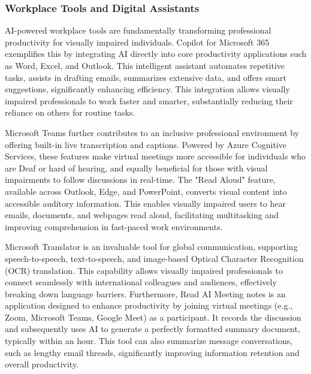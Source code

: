 \subsubsection{Workplace Tools and Digital Assistants}

AI-powered workplace tools are fundamentally transforming professional productivity for visually impaired individuals. Copilot for Microsoft 365 exemplifies this by integrating AI directly into core productivity applications such as Word, Excel, and Outlook. This intelligent assistant automates repetitive tasks, assists in drafting emails, summarizes extensive data, and offers smart suggestions, significantly enhancing efficiency. This integration allows visually impaired professionals to work faster and smarter, substantially reducing their reliance on others for routine tasks. \cite{lexgillette2024}

Microsoft Teams further contributes to an inclusive professional environment by offering built-in live transcription and captions. Powered by Azure Cognitive Services, these features make virtual meetings more accessible for individuals who are Deaf or hard of hearing, and equally beneficial for those with visual impairments to follow discussions in real-time. \cite{lexgillette2024} The "Read Aloud" feature, available across Outlook, Edge, and PowerPoint, converts visual content into accessible auditory information. This enables visually impaired users to hear emails, documents, and webpages read aloud, facilitating multitasking and improving comprehension in fast-paced work environments. \cite{lexgillette2024}

Microsoft Translator is an invaluable tool for global communication, supporting speech-to-speech, text-to-speech, and image-based Optical Character Recognition (OCR) translation. This capability allows visually impaired professionals to connect seamlessly with international colleagues and audiences, effectively breaking down language barriers. \cite{lexgillette2024} Furthermore, Read AI Meeting notes is an application designed to enhance productivity by joining virtual meetings (e.g., Zoom, Microsoft Teams, Google Meet) as a participant. It records the discussion and subsequently uses AI to generate a perfectly formatted summary document, typically within an hour. This tool can also summarize message conversations, such as lengthy email threads, significantly improving information retention and overall productivity. \cite{accessiblepharmacy2024}

